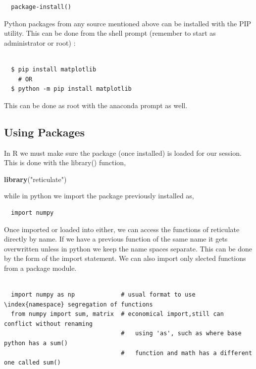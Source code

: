 \documentclass[]{book}
\newenvironment{Shaded}{\begin{snugshade}}{\end{snugshade}}
\newcommand{\KeywordTok}[1]{\textcolor[rgb]{0.13,0.29,0.53}{\textbf{#1}}}
\newcommand{\StringTok}[1]{\textcolor[rgb]{0.31,0.60,0.02}{#1}}
\newcommand{\NormalTok}[1]{#1}
\theoremstyle{definition}
\theoremstyle{definition}
\theoremstyle{definition}
\theoremstyle{remark}
\begin{document}
\begin{verbatim}
  package-install()
\end{verbatim}

Python packages from any source mentioned above can be installed with
the PIP utility. This can be done from the shell prompt (remember to
start as administrator or root) :

\begin{verbatim}

  $ pip install matplotlib  
    # OR
  $ python -m pip install matplotlib
\end{verbatim}

This can be done as root with the anaconda prompt as well.

\subsection{Using Packages}\label{using-packages}

In R we must make sure the package (once installed) is loaded for our
session. This is done with the library() function,

\begin{Shaded}
\begin{Highlighting}[]
  \KeywordTok{library}\NormalTok{(}\StringTok{"reticulate"}\NormalTok{)}
\end{Highlighting}
\end{Shaded}

while in python we import the package previously installed as,

\begin{verbatim}
  import numpy
\end{verbatim}

Once imported or loaded into either, we can access the functions of
reticulate directly by name. If we have a previous function of the same
name it gets overwritten unless in python we keep the name spaces
separate. This can be done by the form of the import statement. We can
also import only slected functions from a package module.

\begin{verbatim}

  import numpy as np             # usual format to use \index{namespace} segregation of functions
  from numpy import sum, matrix  # economical import,still can conflict without renaming 
                                 #   using 'as', such as where base python has a sum()  
                                 #   function and math has a different one called sum()
\end{verbatim}
\end{document}
